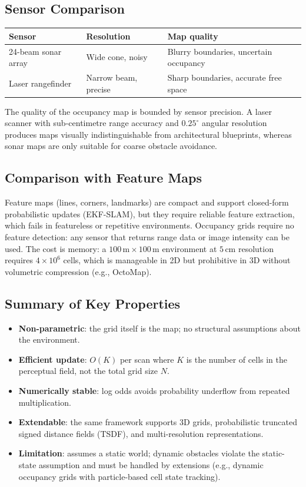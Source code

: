 \documentclass[11pt,a4paper]{article}
\theoremstyle{definition}
\theoremstyle{plain}
\theoremstyle{remark}
\begin{document}
\subsection{Sensor Comparison}

\begin{center}
\begin{tabular}{lll}
\hline
\textbf{Sensor} & \textbf{Resolution} & \textbf{Map quality} \\
\hline
24-beam sonar array & Wide cone, noisy & Blurry boundaries, uncertain occupancy \\
Laser rangefinder & Narrow beam, precise & Sharp boundaries, accurate free space \\
\hline
\end{tabular}
\end{center}

The quality of the occupancy map is bounded by sensor precision. A laser scanner with sub-centimetre range accuracy and $0.25^\circ$ angular resolution produces maps visually indistinguishable from architectural blueprints, whereas sonar maps are only suitable for coarse obstacle avoidance.

\subsection{Comparison with Feature Maps}

Feature maps (lines, corners, landmarks) are compact and support closed-form probabilistic updates (EKF-SLAM), but they require reliable feature extraction, which fails in featureless or repetitive environments. Occupancy grids require no feature detection: any sensor that returns range data or image intensity can be used. The cost is memory: a $100\,\mathrm{m} \times 100\,\mathrm{m}$ environment at $5\,\mathrm{cm}$ resolution requires $4 \times 10^6$ cells, which is manageable in 2D but prohibitive in 3D without volumetric compression (e.g., OctoMap).

\subsection{Summary of Key Properties}

\begin{itemize}
    \item \textbf{Non-parametric}: the grid itself is the map; no structural assumptions about the environment.
    \item \textbf{Efficient update}: $O(K)$ per scan where $K$ is the number of cells in the perceptual field, not the total grid size $N$.
    \item \textbf{Numerically stable}: log odds avoids probability underflow from repeated multiplication.
    \item \textbf{Extendable}: the same framework supports 3D grids, probabilistic truncated signed distance fields (TSDF), and multi-resolution representations.
    \item \textbf{Limitation}: assumes a static world; dynamic obstacles violate the static-state assumption and must be handled by extensions (e.g., dynamic occupancy grids with particle-based cell state tracking).
\end{itemize}
\end{document}
